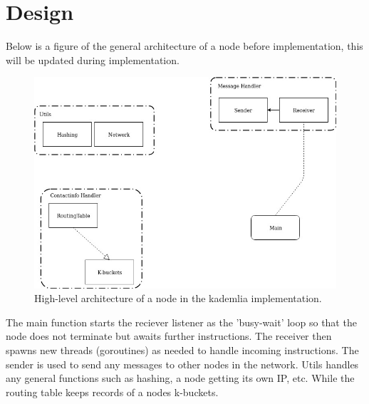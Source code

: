 \section{Design}\label{sec:design}

Below is a figure of the general architecture of a node before implementation, this will be updated during implementation.
\begin{figure}[ht]
\centering
\includegraphics[width=\linewidth]{D7024E-architecture.jpg}
\caption{High-level architecture of a node in the kademlia implementation.}
\end{figure}

The main function starts the reciever listener as the 'busy-wait' loop so that the node does not terminate but awaits further instructions. The receiver then spawns new threads (goroutines) as needed to handle incoming instructions. The sender is used to send any messages to other nodes in the network. Utils handles any general functions such as hashing, a node getting its own IP, etc. While the routing table keeps records of a nodes k-buckets.


